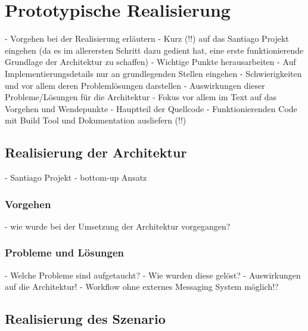 
\chapter{Prototypische Realisierung} %
\label{cha:prototypische_realisierung}

- Vorgehen bei der Realisierung erläutern
- Kurz (!!) auf das Santiago Projekt eingehen (da es im allerersten Schritt dazu gedient hat, eine erste funktionierende Grundlage der Architektur zu schaffen)
- Wichtige Punkte herausarbeiten
- Auf Implementierungsdetails nur an grundlegenden Stellen eingehen
- Schwierigkeiten und vor allem deren Problemlösungen darstellen
- Auswirkungen dieser Probleme/Lösungen für die Architektur
- Fokus vor allem im Text auf das Vorgehen und Wendepunkte
- Hauptteil der Quellcode
- Funktionierenden Code mit Build Tool und Dokumentation ausliefern (!!)

\section{Realisierung der Architektur} %
\label{sec:realisierung_der_architektur}

  - Santiago Projekt
  - bottom-up Ansatz
  
\subsection{Vorgehen} %
\label{sub:vorgehen_architektur}

  - wie wurde bei der Umsetzung der Architektur vorgegangen?

  
\subsection{Probleme und Lösungen} %
\label{sub:probleme_und_loesungen_architektur}

  - Welche Probleme sind aufgetaucht?
  - Wie wurden diese gelöst?
  - Auswirkungen auf die Architektur!
  - Workflow ohne externes Messaging System möglich!?



\section{Realisierung des Szenario} %
\label{sec:realisierung_des_szenario}

